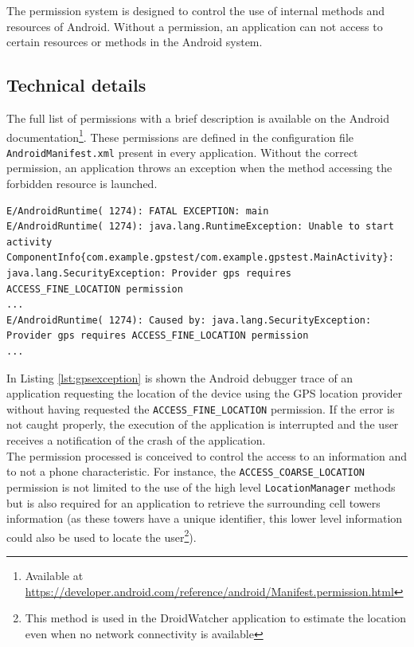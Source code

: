 The permission system is designed to control the use of internal methods and resources of Android.
Without a permission, an application can not access to certain resources or methods in the Android system.

\subsection{Technical details}
The full list of permissions with a brief description is available on the Android documentation\footnote{Available at \url{https://developer.android.com/reference/android/Manifest.permission.html}}.
These permissions are defined in the configuration file \texttt{AndroidManifest.xml} present in every application.
Without the correct permission, an application throws an exception when the method accessing the forbidden resource is launched.

\begin{lstlisting}[breaklines,caption={Example of permission violation log},label={lst:gpsexception},numbers=none]
E/AndroidRuntime( 1274): FATAL EXCEPTION: main
E/AndroidRuntime( 1274): java.lang.RuntimeException: Unable to start activity ComponentInfo{com.example.gpstest/com.example.gpstest.MainActivity}: java.lang.SecurityException: Provider gps requires ACCESS_FINE_LOCATION permission
...
E/AndroidRuntime( 1274): Caused by: java.lang.SecurityException: Provider gps requires ACCESS_FINE_LOCATION permission
...
\end{lstlisting}

In Listing \ref{lst:gpsexception} is shown the Android debugger trace of an application requesting the location of the device using the GPS location provider without having requested the \texttt{ACCESS\_FINE\_LOCATION} permission.
If the error is not caught properly, the execution of the application is interrupted and the user receives a notification of the crash of the application.\\

The permission processed is conceived to control the access to an information and to not a phone characteristic.
For instance, the \texttt{ACCESS\_COARSE\_LOCATION} permission is not limited to the use of the high level \texttt{LocationManager} methods but is also required for an application to retrieve the surrounding cell towers information (as these towers have a unique identifier, this lower level information could also be used to locate the user\footnote{This method is used in the DroidWatcher application to estimate the location even when no network connectivity is available}).

